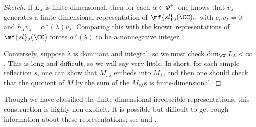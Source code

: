 \documentclass{article}
\begin{document}
\begin{proof}[Sketch]
	If $L_\lambda$ is finite-dimensional, then for each $\alpha\in\Phi^+$, one knows that $v_\lambda$ generates a finite-dimensional representation of $\mf{sl}_2(\CC)_\alpha$ with $e_\alpha v_\lambda=0$ and $h_\alpha v_\lambda=\alpha^\lor(\lambda)v_\lambda$. Comparing this with the known representations of $\mf{sl}_2(\CC)$ forces $\alpha^\lor(\lambda)$ to be a nonnegative integer.
	
	Conversely, suppose $\lambda$ is dominant and integral, so we must check $\dim_\CC L_\lambda<\infty$. This is long and difficult, so we will say very little. In short, for each simple reflection $s$, one can show that $M_{s\lambda}$ embeds into $M_\lambda$, and then one should check that the quotient of $M$ by the sum of the $M_{s\lambda}$s is finite-dimensional.
\end{proof}
\begin{remark}
	Though we have classified the finite-dimensional irreducible representations, this construction is highly non-explicit. It is possible but difficult to get rough information about these representations; see  and .
\end{remark}
\end{document}
